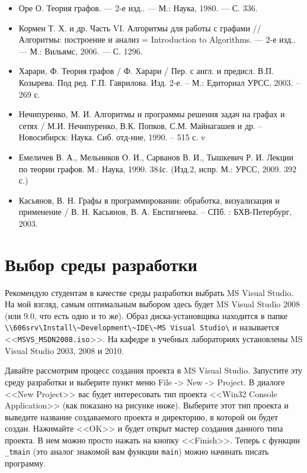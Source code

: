 \begin{itemize}
\item Оре О. Теория графов. — 2-е изд.. — М.: Наука, 1980. — С. 336.
\item Кормен Т. Х. и др. Часть VI. Алгоритмы для работы с графами //
  Алгоритмы: построение и анализ = Introduction to Algorithms. — 2-е
  изд.. — М.: Вильямс, 2006. — С. 1296.
\item Харари, Ф. Теория графов / Ф. Харари / Пер. с англ. и
  предисл. В.П. Козырева. Под ред. Г.П. Гаврилова. Изд. 2-е. – М.:
  Едиториал УРСС, 2003. – 269 с.
\item Нечипуренко, М. И. Алгоритмы и программы решения задач на графах
  и сетях / М.И. Нечипуренко, В.К. Попков, С.М. Майнагашев и др. –
  Новосибирск: Наука. Сиб. отд-ние, 1990. – 515 с.
v\item Емеличев В. А., Мельников О. И., Сарванов В. И., Тышкевич
  Р. И. Лекции по теории графов. М.: Наука, 1990. 384с. (Изд.2,
  испр. М.: УРСС, 2009. 392 с.)
\item Касьянов, В. Н. Графы в программировании: обработка,
  визуализация и применение / В. Н. Касьянов, В. А. Евстигнеева. –
  СПб. : БХВ-Петербург, 2003.
\end{itemize}

\section{Выбор среды разработки}

Рекомендую студентам в качестве среды разработки выбрать MS Visual
Studio. На мой взгляд, самым оптимальным выбором здесь будет MS Visual
Studio 2008 (или 9.0, что есть одно и то же). Образ диска-установщика
находится в папке
\verb|\\606srv\Install\~Development\~IDE\~MS Visual Studio\| и
называется <<\verb|MSVS_MSDN2008.iso|>>. На кафедре в учебных
лабораториях установлены MS Visual Studio 2003, 2008 и 2010.

Давайте рассмотрим процесс создания проекта в MS Visual
Studio. Запустите эту среду разработки и выберите пункт меню File ->
New -> Project. В диалоге <<New Project>> вас будет интересовать тип
проекта <<Win32 Console Application>> (как показано на рисунке
ниже). Выберите этот тип проекта и выведите название создаваемого
проекта и директорию, в которой он будет создан. Нажимайте <<OK>> и
будет открыт мастер создания данного типа проекта. В нем можно просто
нажать на кнопку <<Finish>>. Теперь с функции \lstinline{_tmain} (это
аналог знакомой вам функции \lstinline{main}) можно начинать писать
программу.

